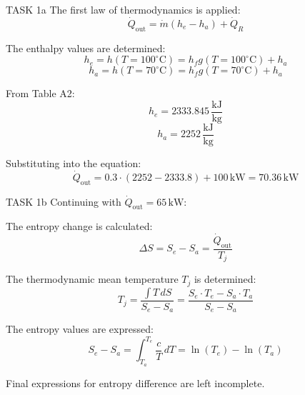 TASK 1a  
The first law of thermodynamics is applied:  
\[
\dot{Q}_{\text{out}} = \dot{m} (h_e - h_a) + \dot{Q}_R
\]  

The enthalpy values are determined:  
\[
h_e = h(T = 100^\circ\text{C}) = h_fg(T = 100^\circ\text{C}) + h_a
\]  
\[
h_a = h(T = 70^\circ\text{C}) = h_fg(T = 70^\circ\text{C}) + h_a
\]  

From Table A2:  
\[
h_e = 2333.845 \, \frac{\text{kJ}}{\text{kg}}
\]  
\[
h_a = 2252 \, \frac{\text{kJ}}{\text{kg}}
\]  

Substituting into the equation:  
\[
\dot{Q}_{\text{out}} = 0.3 \cdot (2252 - 2333.8) + 100 \, \text{kW} = 70.36 \, \text{kW}
\]  

TASK 1b  
Continuing with \( \dot{Q}_{\text{out}} = 65 \, \text{kW} \):  

The entropy change is calculated:  
\[
\Delta S = S_e - S_a = \frac{\dot{Q}_{\text{out}}}{T_j}
\]  

The thermodynamic mean temperature \( T_j \) is determined:  
\[
T_j = \frac{\int T \, dS}{S_e - S_a} = \frac{S_e \cdot T_e - S_a \cdot T_a}{S_e - S_a}
\]  

The entropy values are expressed:  
\[
S_e - S_a = \int_{T_a}^{T_e} \frac{c}{T} \, dT = \ln(T_e) - \ln(T_a)
\]  

Final expressions for entropy difference are left incomplete.